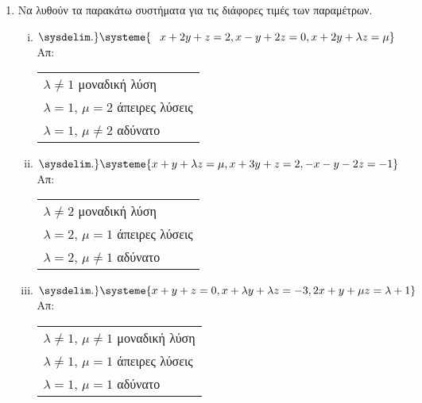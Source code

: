 


\usepackage{systeme}

\pagestyle{askhseis}

\setlength{\itemsep}{\baselineskip}





\begin{center}
  \minibox{\large \bfseries \textcolor{Col1}{Ασκήσεις στα παραμετρικά  συστήματα}}
\end{center}

\vspace{\baselineskip}

\begin{enumerate}
  \setlength{\itemsep}{\baselineskip}
\item Να λυθούν τα παρακάτω συστήματα για τις διάφορες τιμές των παραμέτρων.

  \begin{enumerate}[i)]
    \setlength{\itemsep}{\baselineskip}
\item $\sysdelim.\} \systeme{\phantom{-}x+2y+z=2, x-y+2z=0, x+2y+\lambda z= \mu}$ \hfill Απ: \begin{tabular}{l}
    $\lambda\neq 1$ μοναδική λύση \\
    $\lambda=1$, $\mu=2$ άπειρες λύσεις \\
    $\lambda=1$, $\mu\neq 2$ αδύνατο
  \end{tabular}
     \item $\sysdelim.\} \systeme{x+y+\lambda z = \mu, x+3y+z = 2, -x-y-2z = -1}$ \hfill Απ: \begin{tabular}{l}
         $\lambda\neq 2$ μοναδική λύση \\
         $\lambda=2$, $\mu=1$ άπειρες λύσεις \\
         $\lambda=2$, $\mu\neq 1$ αδύνατο
       \end{tabular}

     \item $ \sysdelim.\} \systeme{
       x + y + z = 0, 
       x + \lambda y + \lambda z = -3, 
       2x + y + \mu z = \lambda + 1
     } $ \hfill Απ: \begin{tabular}{l}
       $ \lambda \neq 1 $, $ \mu \neq 1 $ μοναδική λύση \\
       $ \lambda \neq  1 $, $ \mu = 1 $ άπειρες λύσεις \\
       $ \lambda =1 $, $ \mu = 1 $  αδύνατο  


     \end{tabular}


\end{enumerate}
\end{enumerate}
